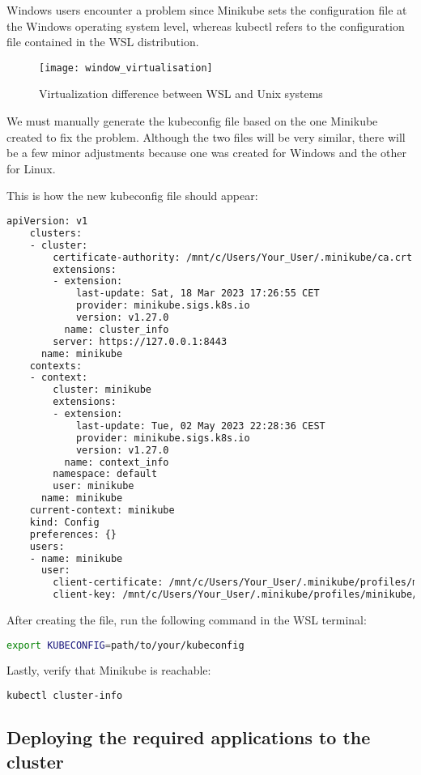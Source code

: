 Windows users encounter a problem since Minikube sets the configuration file at the Windows operating system level, whereas kubectl refers to the configuration file contained in the WSL distribution.

\begin{figure}[H]
	\centering
	\texttt{[image: window\_virtualisation]}
	\label{fig:window_virtualisation}
	\caption{Virtualization difference between WSL and Unix systems}
\end{figure}

We must manually generate the kubeconfig file based on the one Minikube created to fix the problem. Although the two files will be very similar, there will be a few minor adjustments because one was created for Windows and the other for Linux.

This is how the new kubeconfig file should appear:
\begin{lstlisting}[language=bash]
	apiVersion: v1
	clusters:
	- cluster:
		certificate-authority: /mnt/c/Users/Your_User/.minikube/ca.crt
		extensions:
		- extension:
			last-update: Sat, 18 Mar 2023 17:26:55 CET
			provider: minikube.sigs.k8s.io
			version: v1.27.0
		  name: cluster_info
		server: https://127.0.0.1:8443
	  name: minikube
	contexts:
	- context:
		cluster: minikube
		extensions:
		- extension:
			last-update: Tue, 02 May 2023 22:28:36 CEST
			provider: minikube.sigs.k8s.io
			version: v1.27.0
		  name: context_info
		namespace: default
		user: minikube
	  name: minikube
	current-context: minikube
	kind: Config
	preferences: {}
	users:
	- name: minikube
	  user:
		client-certificate: /mnt/c/Users/Your_User/.minikube/profiles/minikube/client.crt
		client-key: /mnt/c/Users/Your_User/.minikube/profiles/minikube/client.key
\end{lstlisting}

After creating the file, run the following command in the WSL terminal:
\begin{lstlisting}[language=bash]
	export KUBECONFIG=path/to/your/kubeconfig
\end{lstlisting}

Lastly, verify that Minikube is reachable:
\begin{lstlisting}[language=bash]
	kubectl cluster-info
\end{lstlisting}

\subsection{Deploying the required applications to the cluster}

